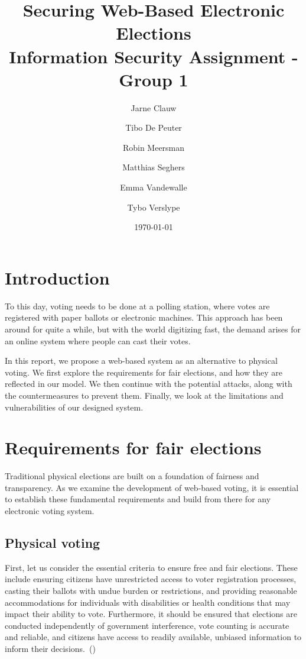 \documentclass[a4paper,12pt,english]{article}
\title{Securing Web-Based Electronic Elections
\\
\large Information Security Assignment - Group 1}
\author{Jarne Clauw
    \and
    Tibo De Peuter
    \and
    Robin Meersman
    \and
    Matthias Seghers
    \and
    Emma Vandewalle
    \and
    Tybo Verslype
}
\date{\today}
\begin{document}
\maketitle

\section{Introduction}\label{sec:introduction}

To this day, voting needs to be done at a polling station, where votes are registered with paper ballots or electronic machines. This approach has been around for quite a while, but with the world digitizing fast, the demand arises for an online system where people can cast their votes.

In this report, we propose a web-based system as an alternative to physical voting. We first explore the requirements for fair elections, and how they are reflected in our model. We then continue with the potential attacks, along with the countermeasures to prevent them. Finally, we look at the limitations and vulnerabilities of our designed system.

\section{Requirements for fair elections}\label{sec:requirements}

Traditional physical elections are built on a foundation of fairness and transparency. As we examine the development of web-based voting, it is essential to establish these fundamental requirements and build from there for any electronic voting system.

\subsection{Physical voting}\label{sec:requirements-physical}

First, let us consider the essential criteria to ensure free and fair elections. These include ensuring citizens have unrestricted access to voter registration processes, casting their ballots with undue burden or restrictions, and providing reasonable accommodations for individuals with disabilities or health conditions that may impact their ability to vote. Furthermore, it should be ensured that elections are conducted independently of government interference, vote counting is accurate and reliable, and citizens have access to readily available, unbiased information to inform their decisions.~(\cite{european-liberties-platform-2021})
\end{document}
